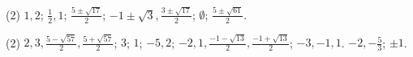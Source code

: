 \documentclass[11pt,a4paper]{scrartcl}
\begin{document}
\begin{problem} \phantom{text}
\begin{tasks}[label={(\arabic*)}, label-offset=0.9em](2)
    \task $1, 2$;
    \task \(\frac{1}{2}, 1\);
    \task \(\frac{5 \pm \sqrt{17}}{2}\);
    \task \(-1 \pm \sqrt{3}, \frac{3 \pm \sqrt{17}}{2}\);
    \task \(\emptyset\);
    \task \(\frac{5 \pm \sqrt{61}}{2}\).
\end{tasks}
\end{problem}

\begin{problem} \phantom{text}
\begin{tasks}[label={(\arabic*)}, label-offset=0.9em](2)
    \task \(2, 3, \frac{5-\sqrt{57}}{2}, \frac{5+\sqrt{57}}{2}\);
    \task $3$;
    \task $1$;
    \task $-5, 2$;
    \task \(-2, 1, \frac{-1-\sqrt{13}}{2}, \frac{-1+\sqrt{13}}{2}\);
    \task $-3, -1, 1$.
    \task $-2, -\frac{5}{3}$;
    \task $\pm1$.
\end{tasks}
\end{problem}
\end{document}
